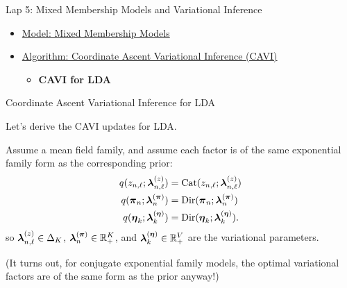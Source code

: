 \documentclass[aspectratio=169]{beamer}
\begin{document}
\begin{frame}{Lap 5: Mixed Membership Models and Variational Inference}
\begin{itemize}
    \item \hyperref[sec:models]{Model: Mixed Membership Models}
    \item \hyperref[sec:cavi]{Algorithm: Coordinate Ascent Variational Inference (CAVI)}
    \begin{itemize}
        \item \textbf{CAVI for LDA}
    \end{itemize}
\end{itemize}
\end{frame}

\begin{frame}{Coordinate Ascent Variational Inference for LDA}

Let's derive the CAVI updates for LDA.

Assume a mean field family, and assume each factor is of the same exponential family form as the corresponding prior:
\begin{align}
    q(z_{n,\ell}; \boldsymbol{\lambda}^{(z)}_{n, \ell}) &= \mathrm{Cat}(z_{n, \ell}; \boldsymbol{\lambda}^{(z)}_{n, \ell}) \\
    q(\boldsymbol{\pi}_n; \boldsymbol{\lambda}^{(\boldsymbol{\pi})}_{n}) &= \mathrm{Dir}(\boldsymbol{\pi}_n; \boldsymbol{\lambda}^{(\boldsymbol{\pi})}_{n}) \\
    q(\boldsymbol{\eta}_k; \boldsymbol{\lambda}^{(\boldsymbol{\eta})}_{k}) &= \mathrm{Dir}(\boldsymbol{\eta}_k; \boldsymbol{\lambda}^{(\boldsymbol{\eta})}_{k}).
\end{align}
so $\boldsymbol{\lambda}^{(z)}_{n, \ell} \in \Delta_K$, $\boldsymbol{\lambda}^{(\boldsymbol{\pi})}_{n} \in \mathbb{R}_+^K$, and $\boldsymbol{\lambda}^{(\boldsymbol{\eta})}_{k} \in \mathbb{R}_+^V$ are the variational parameters.

(It turns out, for conjugate exponential family models, the optimal variational factors are of the same form as the prior anyway!)
\end{frame}
\end{document}
